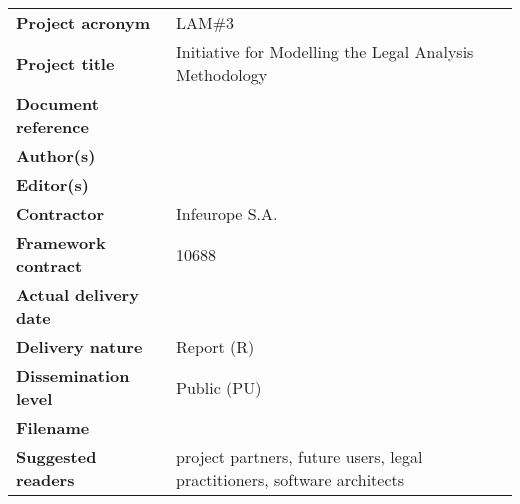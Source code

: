 \clearpage


\setlength{\headheight}{1cm}
\setlength{\footskip}{18mm}
\addtolength{\textheight}{-\footskip}
\pagestyle{empty}

\clearpage



\vspace{6cm}

\begin{flushleft}
\begin{table*}[!b]
\begin{tabular}{p{4.5cm}p{\textwidth-5cm}}
	\textbf{Project acronym}       &   LAM\#3\\
	\textbf{Project title}    &   Initiative for Modelling the Legal Analysis Methodology  \\
	\textbf{Document reference} 	&   \DelTitle \\	
	\textbf{Author(s)}             &   \DelAuthor \\
	\textbf{Editor(s)}             &   \DelAuthor \\
	\textbf{Contractor}    &   Infeurope S.A. \\
	\textbf{Framework contract}    &   10688 \\		
	\textbf{Actual delivery date}  &   \DelDate \\    
	\textbf{Delivery nature}     	&   Report (R) \\
	\textbf{Dissemination level} 	&   Public (PU) \\
	\textbf{Filename}           	&   \DelFilename\\
	\textbf{Suggested readers}    	&   project partners, future users, legal practitioners, software architects\\
\end{tabular}
\end{table*}
\end{flushleft}



\clearpage

\clearpage





